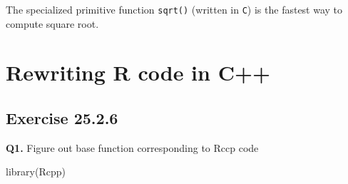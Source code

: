 \documentclass[
]{book}
\newenvironment{Shaded}{\begin{snugshade}}{\end{snugshade}}
\newcommand{\FunctionTok}[1]{\textcolor[rgb]{0.00,0.00,0.00}{#1}}
\newcommand{\NormalTok}[1]{#1}
\begin{document}
The specialized primitive function \texttt{sqrt()} (written in \texttt{C}) is the fastest way to compute square root.

\hypertarget{rewriting-r-code-in-c}{%
\chapter{Rewriting R code in C++}\label{rewriting-r-code-in-c}}

\hypertarget{exercise-25.2.6}{%
\section{Exercise 25.2.6}\label{exercise-25.2.6}}

\textbf{Q1.} Figure out base function corresponding to Rccp code

\begin{Shaded}
\begin{Highlighting}[]
\FunctionTok{library}\NormalTok{(Rcpp)}
\end{Highlighting}
\end{Shaded}
\end{document}
